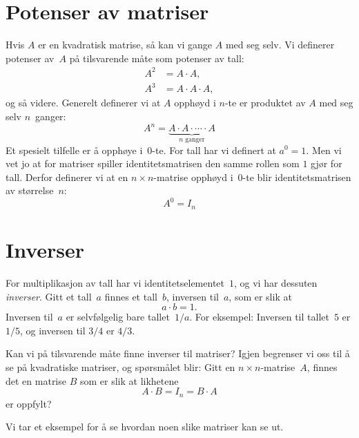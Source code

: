 \section*{Potenser av matriser}

Hvis $A$ er en kvadratisk matrise, så kan vi gange $A$ med seg selv.
Vi definerer potenser av~$A$ på tilsvarende måte som potenser av tall:
\begin{align*}
A^2 &= A \cdot A, \\
A^3 &= A \cdot A \cdot A,
\end{align*}
og så videre.  Generelt definerer vi at $A$ opphøyd i $n$-te er
produktet av $A$ med seg selv $n$~ganger:
\[
A^n = \underbrace{A \cdot A \cdot \cdots \cdot A}_{\text{$n$~ganger}}
\]
Et spesielt tilfelle er å opphøye i~$0$-te.  For tall har vi definert
at $a^0 = 1$.  Men vi vet jo at for matriser spiller
identitetsmatrisen den samme rollen som $1$ gjør for tall.  Derfor
definerer vi at en $n \times n$-matrise opphøyd i~$0$-te blir
identitetsmatrisen av størrelse~$n$:
\[
A^0 = I_n
\]


\section*{Inverser}

For multiplikasjon av tall har vi identitetselementet~$1$, og vi har
dessuten \emph{inverser}.  Gitt et tall~$a$ finnes et tall~$b$,
inversen til~$a$, som er slik at
\[
a \cdot b = 1.
\]
Inversen til~$a$ er selvfølgelig bare tallet~$1/a$.  For eksempel:
Inversen til tallet~$5$ er $1/5$, og inversen til $3/4$ er $4/3$.

Kan vi på tilsvarende måte finne inverser til matriser?  Igjen
begrenser vi oss til å se på kvadratiske matriser, og spørsmålet blir:
Gitt en $n \times n$-matrise~$A$, finnes det en matrise $B$ som er
slik at likhetene
\[
A \cdot B = I_n = B \cdot A
\]
er oppfylt?

Vi tar et eksempel for å se hvordan noen slike matriser kan se ut.


